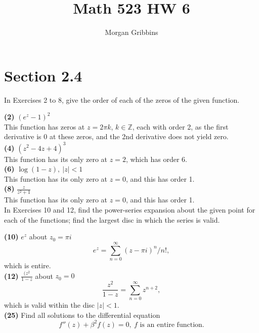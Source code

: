 \documentclass[12pt,letterpaper]{article}
\title{Math 523 HW 6}
\author{Morgan Gribbins}
\date{}
\begin{document}
	
\maketitle

\section*{Section 2.4}

In Exercises 2 to 8, give the order of each of the zeros of the given function.

\textbf{(2)} \((e^{z}-1)^{2}\) \\

This function has zeros at \(z = 2\pi k\), \(k \in \mathbb{Z}\), each with order 2, as the first derivative is \(0\) at these zeros, and the 2nd derivative does not yield zero. \\

\textbf{(4)} \((z^{2}-4z+4)^{3}\) \\

This function has its only zero at \(z=2\), which has order 6.\\

\textbf{(6)} \(\log (1- z),\ |z| < 1\) \\

This function has its only zero at \(z=0\), and this has order 1.\\

\textbf{(8)} \(\frac{z}{z^{2}+1}\) \\

This function has its only zero at \(z=0\), and this has order 1.\\

In Exercises 10 and 12, find the power-series expansion about the given point for each of the functions; find the largest disc in which the series is valid.

\textbf{(10)} \(e^{z}\) about \(z_{0} = \pi i\) \\

\[e^{z} = \sum_{n=0}^{\infty} (z-\pi i)^{n}/n!,\] which is entire. \\

\textbf{(12)} \(\frac{(z^{2}}{1-z}\) about \(z_{0} = 0\) \\

\[\frac{z^{2}}{1-z} = \sum_{n=0}^{\infty} z^{n+2},\] which is valid within the disc \(|z| < 1\). \\

\textbf{(25)} Find all solutions to the differential equation \[f''(z) + \beta^{2}f(z) = 0,\ f \text{ is an entire function.}\] \\
\end{document}
